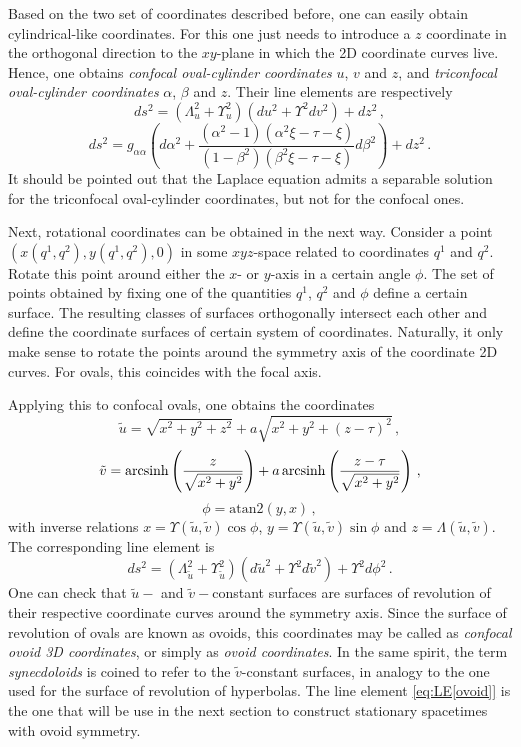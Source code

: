 \documentclass[12pt, ams, nofootinbib]{revtex4}
\def\be{\begin{equation}}
\def\ee{\end{equation}}
\def\arcsinh{{\rm arcsinh}}
\def\X{\Lambda}
\def\Y{\Upsilon}
\newcommand{\rob}[1]{\left(#1\right)}    %
\theoremstyle{definition}
\begin{document}
Based on the two set of coordinates described before, one can easily obtain cylindrical-like coordinates. For this one just needs to introduce a $z$ coordinate in the orthogonal direction to the $xy$-plane in which the 2D coordinate curves live. Hence, one obtains \textit{confocal oval-cylinder coordinates} $u$, $v$ and $z$, and \textit{triconfocal oval-cylinder coordinates} $\alpha$, $\beta$ and $z$. Their line elements are respectively
\be
	ds^2 = \rob{\X_u^2+\Y_u^2}(du^2 + \Y^2 dv^2) + dz^2\,,
\ee
\be
	ds^2 = g_{\alpha\alpha}\rob{d\alpha^2+\frac{(\alpha^2-1)(\alpha^2\xi-\tau-\xi)}{(1-\beta^2)(\beta^2\xi-\tau-\xi)} d\beta^2} + dz^2\,.
\ee
It should be pointed out that the Laplace equation admits a separable solution for the triconfocal oval-cylinder coordinates, but not for the confocal ones.

Next, rotational coordinates can be obtained in the next way. Consider a point $(x(q^1,q^2),y(q^1,q^2),0)$ in some $xyz$-space related to coordinates $q^1$ and $q^2$. Rotate this point around either the $x$- or $y$-axis in a certain angle $\phi$. The set of points obtained by fixing one of the quantities $q^1$, $q^2$ and $\phi$ define a certain surface. The resulting classes of surfaces orthogonally intersect each other and define the coordinate surfaces of certain system of coordinates. Naturally, it only make sense to rotate the points around the symmetry axis of the coordinate 2D curves. For ovals, this coincides with the focal axis. 

Applying this to confocal ovals, one obtains the coordinates
\be
	\tilde{u} = \sqrt{x^2+y^2+z^2} + a \sqrt{x^2 + y^2 + (z-\tau)^2}\,, \label{eq:u(x;y;z)}
\ee
\be	
	\tilde{v} = \arcsinh\left( \frac{z}{\sqrt{x^2 + y^2}} \right) + a\, \arcsinh\left( \frac{z-\tau}{\sqrt{x^2 + y^2}} \right)\,, \label{eq:v(x;y;z)}
\ee
\be
	\phi = \text{atan2}(y,x)\,, \label{eq:phi(x;y;z)}
\ee
with inverse relations $x = \Y(\tilde{u},\tilde{v})\cos\phi$, $y = \Y(\tilde{u},\tilde{v})\sin\phi$ and $z = \X(\tilde{u},\tilde{v})$. The corresponding line element is
\be 
	ds^2 = \rob{\X_{\tilde{u}}^2+\Y_{\tilde{u}}^2}(d\tilde{u}^2 + \Y^2 d\tilde{v}^2) + \Y^2 d\phi^2\,. \label{eq:LE[ovoid]}
\ee
One can check that $\tilde{u}-$ and $\tilde{v}-$constant surfaces are surfaces of revolution of their respective coordinate curves around the symmetry axis. Since the surface of revolution of ovals are known as ovoids, this coordinates may be called as \textit{confocal ovoid 3D coordinates}, or simply as \textit{ovoid coordinates}. In the same spirit, the term \textit{synecdoloids} is coined to refer to the $\tilde{v}$-constant surfaces, in analogy to the one used for the surface of revolution of hyperbolas. The line element \ref{eq:LE[ovoid]} is the one that will be use in the next section to construct stationary spacetimes with ovoid symmetry.
\end{document}
